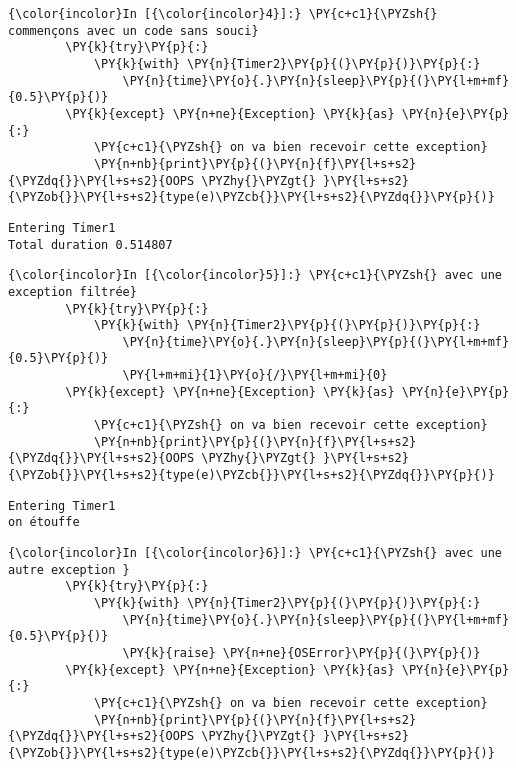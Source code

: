     \begin{Verbatim}[commandchars=\\\{\}]
{\color{incolor}In [{\color{incolor}4}]:} \PY{c+c1}{\PYZsh{} commençons avec un code sans souci}
        \PY{k}{try}\PY{p}{:}
            \PY{k}{with} \PY{n}{Timer2}\PY{p}{(}\PY{p}{)}\PY{p}{:}
                \PY{n}{time}\PY{o}{.}\PY{n}{sleep}\PY{p}{(}\PY{l+m+mf}{0.5}\PY{p}{)}
        \PY{k}{except} \PY{n+ne}{Exception} \PY{k}{as} \PY{n}{e}\PY{p}{:}
            \PY{c+c1}{\PYZsh{} on va bien recevoir cette exception}
            \PY{n+nb}{print}\PY{p}{(}\PY{n}{f}\PY{l+s+s2}{\PYZdq{}}\PY{l+s+s2}{OOPS \PYZhy{}\PYZgt{} }\PY{l+s+s2}{\PYZob{}}\PY{l+s+s2}{type(e)\PYZcb{}}\PY{l+s+s2}{\PYZdq{}}\PY{p}{)}
\end{Verbatim}


    \begin{Verbatim}[commandchars=\\\{\}]
Entering Timer1
Total duration 0.514807

    \end{Verbatim}

    \begin{Verbatim}[commandchars=\\\{\}]
{\color{incolor}In [{\color{incolor}5}]:} \PY{c+c1}{\PYZsh{} avec une exception filtrée}
        \PY{k}{try}\PY{p}{:}
            \PY{k}{with} \PY{n}{Timer2}\PY{p}{(}\PY{p}{)}\PY{p}{:}
                \PY{n}{time}\PY{o}{.}\PY{n}{sleep}\PY{p}{(}\PY{l+m+mf}{0.5}\PY{p}{)}
                \PY{l+m+mi}{1}\PY{o}{/}\PY{l+m+mi}{0}
        \PY{k}{except} \PY{n+ne}{Exception} \PY{k}{as} \PY{n}{e}\PY{p}{:}
            \PY{c+c1}{\PYZsh{} on va bien recevoir cette exception}
            \PY{n+nb}{print}\PY{p}{(}\PY{n}{f}\PY{l+s+s2}{\PYZdq{}}\PY{l+s+s2}{OOPS \PYZhy{}\PYZgt{} }\PY{l+s+s2}{\PYZob{}}\PY{l+s+s2}{type(e)\PYZcb{}}\PY{l+s+s2}{\PYZdq{}}\PY{p}{)}
\end{Verbatim}


    \begin{Verbatim}[commandchars=\\\{\}]
Entering Timer1
on étouffe

    \end{Verbatim}

    \begin{Verbatim}[commandchars=\\\{\}]
{\color{incolor}In [{\color{incolor}6}]:} \PY{c+c1}{\PYZsh{} avec une autre exception }
        \PY{k}{try}\PY{p}{:}
            \PY{k}{with} \PY{n}{Timer2}\PY{p}{(}\PY{p}{)}\PY{p}{:}
                \PY{n}{time}\PY{o}{.}\PY{n}{sleep}\PY{p}{(}\PY{l+m+mf}{0.5}\PY{p}{)}
                \PY{k}{raise} \PY{n+ne}{OSError}\PY{p}{(}\PY{p}{)}
        \PY{k}{except} \PY{n+ne}{Exception} \PY{k}{as} \PY{n}{e}\PY{p}{:}
            \PY{c+c1}{\PYZsh{} on va bien recevoir cette exception}
            \PY{n+nb}{print}\PY{p}{(}\PY{n}{f}\PY{l+s+s2}{\PYZdq{}}\PY{l+s+s2}{OOPS \PYZhy{}\PYZgt{} }\PY{l+s+s2}{\PYZob{}}\PY{l+s+s2}{type(e)\PYZcb{}}\PY{l+s+s2}{\PYZdq{}}\PY{p}{)}
\end{Verbatim}


